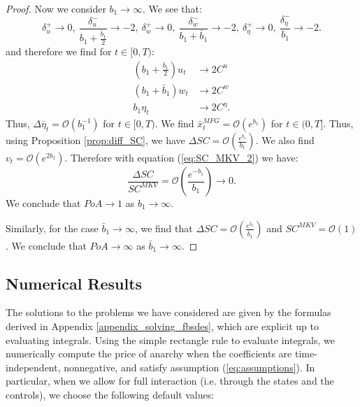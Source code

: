 \documentclass[11pt]{article}
\begin{document}
\begin{proof}
    Now we consider $b_1 \to \infty$. We see that:
    \begin{equation*}
        \delta^+_u \to 0,\ \frac{\delta^-_u}{b_1+\frac{\bar{b}_1}{2}} \to -2,\ \delta^+_w \to 0,\ \frac{\delta^-_w}{b_1+\bar{b}_1} \to -2,\ \delta^+_{\eta} \to 0,\ \frac{\delta^-_{\eta}}{b_1} \to -2.
    \end{equation*}
    and therefore we find for $t \in [0,T)$:
    \begin{equation*}
    \begin{split}
        \left(b_1+\frac{\bar{b}_1}{2}\right)u_t&\to 2 C^u \\
        \left(b_1+\bar{b}_1\right)w_t&\to 2 C^w \\
        b_1 \eta_t&\to 2 C^{\eta}.
    \end{split}
    \end{equation*}
    Thus, $\Delta \bar{\eta}_t=\mathcal{O}(b_1^{-1})$ for $t \in [0,T)$. We find $\bar{x}^{MFG}_t=\mathcal{O}(e^{b_1})$ for $t \in (0,T]$. Thus, using Proposition \ref{prop:diff_SC}, we have $\Delta SC=\mathcal{O}\left(\frac{e^{b_1}}{b_1}\right)$. We also find $v_t=\mathcal{O}(e^{2b_1})$. Therefore with equation (\ref{eq:SC_MKV_2}) we have:
    \begin{equation*}
        \frac{\Delta SC}{SC^{MKV}}=\mathcal{O}\left(\frac{e^{-b_1}}{b_1}\right)\to 0.
    \end{equation*}
    We conclude that $PoA \to 1$ as $b_1 \to \infty$.
    
    Similarly, for the case $\bar{b}_1 \to \infty$, we find that $\Delta SC=\mathcal{O}\left(\frac{e^{\bar{b}_1}}{\bar{b}_1}\right)$ and $SC^{MKV}=\mathcal{O}(1)$. We conclude that $PoA \to \infty$ as $\bar{b}_1 \to \infty$.
\end{proof}


\subsection{\textbf{Numerical Results}}
The solutions to the problems we have considered are given by the formulas derived in Appendix \ref{appendix_solving_fbsdes}, which are explicit up to evaluating integrals. Using the simple rectangle rule to evaluate integrals, we numerically compute the price of anarchy when the coefficients are time-independent, nonnegative, and satisfy assumption (\ref{eq:assumptions}). In particular, when we allow for full interaction (i.e. through the states and the controls), we choose the following default values:
\end{document}
